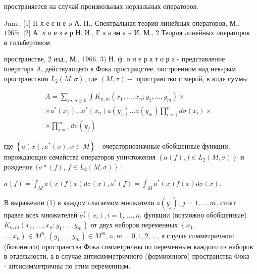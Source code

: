 \documentclass[10pt]{article}
\begin{document}
пространяется на случай произвольных норлальных операторов.



Jum.: [1] П л е с н е p А. П., Спектральная теория линейных операторов, М., $1965 ;$ [2] А' х и е з е р Н. И., Г л а зм а н И. М., 2 Теория линейных операторов в гильбертовом

пространстве, 2 изд., М., 1966. 3) Н. ф. о п е р а т о р а - представление оператора $A$, действующего в Фока прострацстее, построенном над нек-рым пространством $L_{2}(M, \sigma)$, где $(M, \sigma)-$ пространство с мерой, в виде суммы



\[

\begin{gathered}

A=\sum_{m, n \geqslant 0} \int K_{n, m}\left(x_{1}, \ldots, x_{n} ; y_{1}, \ldots, y_{m}\right) \times \\

\times a^{*}\left(x_{1}\right) \ldots a^{*}\left(x_{n}\right) a\left(y_{1}\right) \ldots a\left(y_{m}\right) \prod_{i=1}^{n} d \sigma\left(x_{i}\right) \times \\

\times \prod_{j=1}^{m} d \sigma\left(y_{j}\right)

\end{gathered}

\]



где $\left\{a(x), a^{*}(x), x \in M\right\}$ - очераторнозначные обобщенные функции, порождающие семейства операторов уничтожения $\left\{a(f), f \in L_{2}(M, \sigma)\right\}$ и рождения $\{a *(f)$, $\left.f \in L_{2}(M, \sigma)\right\}:$



$a(f)=\int_{M} a(x) f(x) d \sigma(x), a^{*}(f)=\int_{M} a^{*}(x) \bar{f}(x) d \sigma(x)$.



В выражении (1) в каждом слагаемом множители $a\left(y_{j}\right)$, $j=1, \ldots, m$, стоят правее всех множителей $a_{*}^{*}\left(x_{i}\right), i=1$, $\ldots, n$, функции (возможно обобщенные) $K_{n, m}\left(x_{1}\right.$, $\left.\ldots, x_{n} ; y_{1}, \ldots, y_{m}\right)$ от двух наборов переменных $\left(x_{1}\right.$, $\left.\ldots, x_{n}\right) \in M^{n},\left(y_{1}, \ldots, y_{m}\right) \in M^{m}, n, m=0,1,2, \ldots$, в случае симметричного (бозонного) пространства Фока симметричны по переменным каждого из наборов в отдельности, а в случае антисимметричного (фермионного) пространства Фока - антисимметричны по этим переменным.
\end{document}
